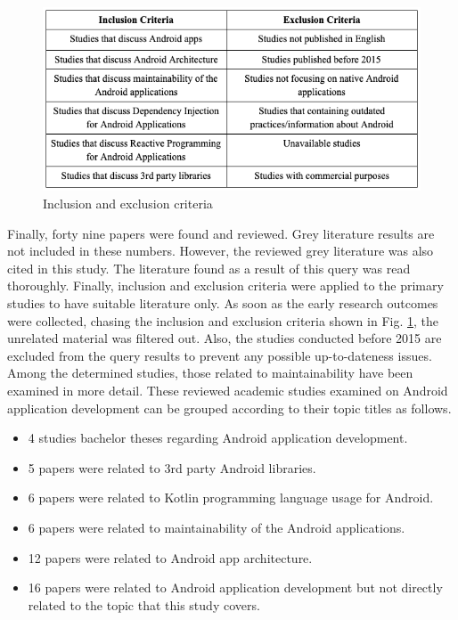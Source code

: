\begin{figure}[ht!]
    \centering
    \includegraphics[scale=0.5]{figures/research_query_criteria.png}
    \caption{Inclusion and exclusion criteria}
    \label{fig:lit_review_research_query_criteria}
\end{figure}
\FloatBarrier

Finally, forty nine papers were found and reviewed. Grey literature results are not included in these numbers. However, the reviewed grey literature was also cited in this study.  The literature found as a result of this query was read thoroughly. Finally, inclusion and exclusion criteria were applied to the primary studies to have suitable literature only. As soon as the early research outcomes were collected, chasing the inclusion and exclusion criteria shown in Fig. \ref{fig:lit_review_research_query_criteria}, the unrelated material was filtered out. Also, the studies conducted before 2015 are excluded from the query results to prevent any possible up-to-dateness issues. Among the determined studies, those related to maintainability have been examined in more detail. These reviewed academic studies examined on Android application development can be grouped according to their topic titles as follows.
\begin{itemize}
    \item 4 studies bachelor theses regarding Android application development.
    \item 5 papers were related to 3rd party Android libraries.
    \item 6 papers were related to Kotlin programming language usage for Android.
    \item 6 papers were related to maintainability of the Android applications.
    \item 12 papers were related to Android app architecture.
    \item 16 papers were related to Android application development but not directly related to the topic that this study covers.
\end{itemize}

